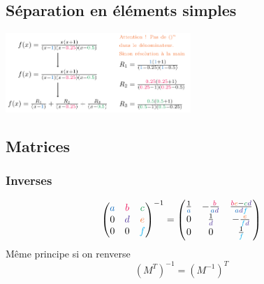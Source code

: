 \documentclass[resume]{subfiles}
\begin{document}
\subsection{Séparation en éléments simples}
\begin{center}
\includegraphics[width=7cm]{drwg_6.pdf}
\end{center}

\subsection{Matrices}
\subsubsection{Inverses}
$$\begin{pmatrix}
\textcolor{RoyalBlue}{a} & \textcolor{OrangeRed}{b} & \textcolor{ForestGreen}{c}\\
0 & \textcolor{Violet}{d} & \textcolor{Orange}{e}\\
0 & 0 & \textcolor{ProcessBlue}{f}
\end{pmatrix}^{-1}=\begin{pmatrix}
\frac{1}{\textcolor{RoyalBlue}{a}} & -\frac{\textcolor{OrangeRed}{b}}{\textcolor{RoyalBlue}{a}\textcolor{Violet}{d}} & \frac{\textcolor{OrangeRed}{b}\textcolor{Orange}{e}-\textcolor{ForestGreen}{c}\textcolor{Violet}{d}}{\textcolor{RoyalBlue}{a}\textcolor{Violet}{d}\textcolor{ProcessBlue}{f}}\\
0 & \frac{1}{\textcolor{Violet}{d}} & -\frac{\textcolor{Orange}{e}}{\textcolor{ProcessBlue}{f}\textcolor{Violet}{d}}\\
0 & 0 & \frac{1}{\textcolor{ProcessBlue}{f}}
\end{pmatrix}$$
Même principe si on renverse
$$\left(M^{T}\right)^{-1}=\left(M^{-1}\right)^{T}$$
\end{document}
